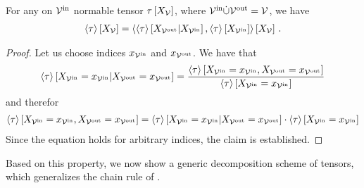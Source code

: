 \begin{theorem}
    \label{the:normalizationContractionEQ}
    For any on $\mathcal{V}^{\mathrm{in}}$ normable tensor $\tau\left[X_{\mathcal{V}}\right]$, where $\mathcal{V}^{\mathrm{in}}\dot{\cup}\mathcal{V}^{\mathrm{out}}=\mathcal{V}$, we have
    \begin{align*}
        \left\langle \tau\right\rangle \left[ X_{\mathcal{V}} \right]
        = \left\langle \left\langle \tau\right\rangle \left[ X_{\mathcal{V}^{\mathrm{out}}} | X_{\mathcal{V}^{\mathrm{in}}} \right],\left\langle \tau\right\rangle \left[ X_{\mathcal{V}^{\mathrm{in}}} \right]\right\rangle \left[ X_{\mathcal{V}} \right] \, .
    \end{align*}
\end{theorem}
\begin{proof}
    Let us choose indices $x_{\mathcal{V}^{\mathrm{in}}}$ and $x_{\mathcal{V}^{\mathrm{out}}}$.
    We have that
    \begin{align*}
        \left\langle \tau\right\rangle \left[ X_{\mathcal{V}^{\mathrm{in}}}=x_{\mathcal{V}^{\mathrm{in}}} | X_{\mathcal{V}^{\mathrm{out}}}=x_{\mathcal{V}^{\mathrm{out}}} \right]
        = \frac{
            \left\langle \tau\right\rangle \left[ X_{\mathcal{V}^{\mathrm{in}}}=x_{\mathcal{V}^{\mathrm{in}}},X_{\mathcal{V}^{\mathrm{out}}}=x_{\mathcal{V}^{\mathrm{out}}} \right]
        }{
            \left\langle \tau\right\rangle \left[ X_{\mathcal{V}^{\mathrm{in}}}=x_{\mathcal{V}^{\mathrm{in}}} \right]
        }
    \end{align*}
    and therefor
    \begin{align*}
        \left\langle \tau\right\rangle \left[ X_{\mathcal{V}^{\mathrm{in}}}=x_{\mathcal{V}^{\mathrm{in}}},X_{\mathcal{V}^{\mathrm{out}}}=x_{\mathcal{V}^{\mathrm{out}}} \right] =
        \left\langle \tau\right\rangle \left[ X_{\mathcal{V}^{\mathrm{in}}}=x_{\mathcal{V}^{\mathrm{in}}} | X_{\mathcal{V}^{\mathrm{out}}}=x_{\mathcal{V}^{\mathrm{out}}} \right]
        \cdot
        \left\langle \tau\right\rangle \left[ X_{\mathcal{V}^{\mathrm{in}}}=x_{\mathcal{V}^{\mathrm{in}}} \right]
    \end{align*}
    Since the equation holds for arbitrary indices, the claim is established.
\end{proof}

Based on this property, we now show a generic decomposition scheme of tensors, which generalizes the chain rule of .

